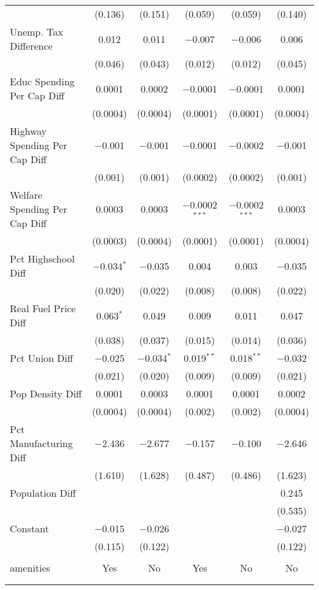 \begin{table}[!htbp]
\begin{tabular}{@{\extracolsep{5pt}}lccccc}
  & (0.136) & (0.151) & (0.059) & (0.059) & (0.140) \\ 
  Unemp. Tax Difference & 0.012 & 0.011 & $-$0.007 & $-$0.006 & 0.006 \\ 
  & (0.046) & (0.043) & (0.012) & (0.012) & (0.045) \\ 
  Educ Spending Per Cap Diff & 0.0001 & 0.0002 & $-$0.0001 & $-$0.0001 & 0.0001 \\ 
  & (0.0004) & (0.0004) & (0.0001) & (0.0001) & (0.0004) \\ 
  Highway Spending Per Cap Diff & $-$0.001 & $-$0.001 & $-$0.0001 & $-$0.0002 & $-$0.001 \\ 
  & (0.001) & (0.001) & (0.0002) & (0.0002) & (0.001) \\ 
  Welfare Spending Per Cap Diff & 0.0003 & 0.0003 & $-$0.0002$^{***}$ & $-$0.0002$^{***}$ & 0.0003 \\ 
  & (0.0003) & (0.0004) & (0.0001) & (0.0001) & (0.0004) \\ 
  Pct Highschool Diff & $-$0.034$^{*}$ & $-$0.035 & 0.004 & 0.003 & $-$0.035 \\ 
  & (0.020) & (0.022) & (0.008) & (0.008) & (0.022) \\ 
  Real Fuel Price Diff & 0.063$^{*}$ & 0.049 & 0.009 & 0.011 & 0.047 \\ 
  & (0.038) & (0.037) & (0.015) & (0.014) & (0.036) \\ 
  Pct Union Diff & $-$0.025 & $-$0.034$^{*}$ & 0.019$^{**}$ & 0.018$^{**}$ & $-$0.032 \\ 
  & (0.021) & (0.020) & (0.009) & (0.009) & (0.021) \\ 
  Pop Density Diff & 0.0001 & 0.0003 & 0.0001 & 0.0001 & 0.0002 \\ 
  & (0.0004) & (0.0004) & (0.002) & (0.002) & (0.0004) \\ 
  Pct Manufacturing Diff & $-$2.436 & $-$2.677 & $-$0.157 & $-$0.100 & $-$2.646 \\ 
  & (1.610) & (1.628) & (0.487) & (0.486) & (1.623) \\ 
  Population Diff &  &  &  &  & 0.245 \\ 
  &  &  &  &  & (0.535) \\ 
  Constant & $-$0.015 & $-$0.026 &  &  & $-$0.027 \\ 
  & (0.115) & (0.122) &  &  & (0.122) \\ 
 \hline \\[-1.8ex] 
amenities & Yes & No & Yes & No & No \\ 
\hline \\[-1.8ex] 
\hline 
\hline \\[-1.8ex] 
\end{tabular} 
\end{table} 
